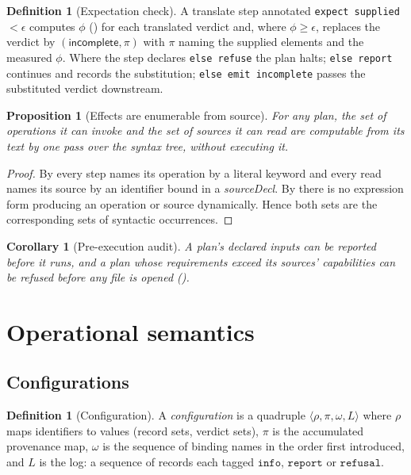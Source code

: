 \documentclass[11pt,twocolumn,a4paper]{article}
\theoremstyle{msthm}
\newtheorem{proposition}[theorem]{Proposition}
\newtheorem{corollary}[theorem]{Corollary}
\theoremstyle{definition}
\newtheorem{definition}[theorem]{Definition}
\theoremstyle{remark}
\newcommand{\ms}[1]{\texttt{#1}}
\newcommand{\Prov}{\pi}
\newcommand{\Ord}{\omega}
\begin{document}
\begin{definition}[Expectation check]
\label{def:expectcheck}
A translate step annotated \ms{expect supplied} $<\epsilon$ computes
$\phi$ () for each \textsf{translated} verdict and,
where $\phi\ge\epsilon$, replaces the verdict by
$(\textsf{incomplete},\pi)$ with $\pi$ naming the supplied elements and
the measured $\phi$. Where the step declares \ms{else refuse} the plan
halts; \ms{else report} continues and records the substitution;
\ms{else emit incomplete} passes the substituted verdict downstream.
\end{definition}

\begin{proposition}[Effects are enumerable from source]
\label{prop:enumerable}
For any plan, the set of operations it can invoke and the set of sources
it can read are computable from its text by one pass over the syntax
tree, without executing it.
\end{proposition}

\begin{proof}
By  every step names its operation by a literal
keyword and every read names its source by an identifier bound in a
\textit{sourceDecl}. By  there is no expression form
producing an operation or source dynamically. Hence both sets are the
corresponding sets of syntactic occurrences.
\end{proof}

\begin{corollary}[Pre-execution audit]
\label{cor:audit}
A plan's declared inputs can be reported before it runs, and a plan
whose requirements exceed its sources' capabilities can be refused
before any file is opened ().
\end{corollary}

\section{Operational semantics}
\label{sec:semantics}

\subsection{Configurations}

\begin{definition}[Configuration]
\label{def:config}
A \emph{configuration} is a quadruple $\langle\rho,\Prov,\Ord,L\rangle$
where $\rho$ maps identifiers to values (record sets, verdict sets),
$\Prov$ is the accumulated provenance map, $\Ord$ is the sequence of
binding names in the order first introduced, and $L$ is the log: a
sequence of records each tagged $\ms{info}$, $\ms{report}$ or
$\ms{refusal}$.
\end{definition}
\end{document}
